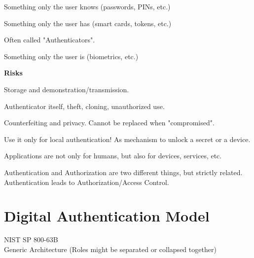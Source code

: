 \begin{multicols}{3}
    \begin{center}
    Something only the user knows (passwords, PINs, etc.)
\end{center}


    
    \columnbreak

    Something only the user has (smart cards, tokens, etc.)

    \vspace{0.1cm}

    Often called "Authenticators".
    \columnbreak

    Something only the user is (biometrics, etc.)


\end{multicols}

\begin{center}
     \textbf{Risks} 
\end{center}


\begin{multicols}{3}
    Storage and demonstration/transmission.

    \columnbreak

    Authenticator itself, theft, cloning, unauthorized use.

    \columnbreak
Counterfeiting and privacy. Cannot be replaced when "compromised".

Use it only for local authentication! As mechanism to unlock a secret or a device.
    
\end{multicols}

Applications are not only for humans, but also for devices, services, etc.

\begin{tcolorbox}[colback=blue!10!white, colframe=blue!50!white, title=What about Authorization]
    Authentication and Authorization are two different things, but strictly related. Authentication leads to Authorization/Access Control.
\end{tcolorbox}

\section{Digital Authentication Model}
\begin{center}
    NIST SP 800-63B \\ Generic Architecture (Roles might be separated or collapsed together)
\end{center}

